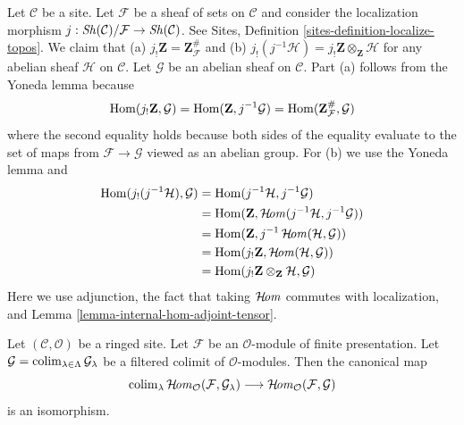 \begin{remark}
\label{remark-j-shriek-tensor}
Let $\mathcal{C}$ be a site. Let $\mathcal{F}$ be a sheaf of
sets on $\mathcal{C}$ and consider the localization morphism
$j : \mathop{\mathit{Sh}}\nolimits(\mathcal{C})/\mathcal{F} \to \mathop{\mathit{Sh}}\nolimits(\mathcal{C})$.
See Sites, Definition \ref{sites-definition-localize-topos}.
We claim that (a) $j_!\mathbf{Z} = \mathbf{Z}_\mathcal{F}^\#$
and (b) $j_!(j^{-1}\mathcal{H}) = j_!\mathbf{Z} \otimes_\mathbf{Z} \mathcal{H}$
for any abelian sheaf $\mathcal{H}$ on $\mathcal{C}$.
Let $\mathcal{G}$ be an abelian sheaf on $\mathcal{C}$.
Part (a) follows from the Yoneda lemma because
$$
\mathop{\mathrm{Hom}}\nolimits(j_!\mathbf{Z}, \mathcal{G}) =
\mathop{\mathrm{Hom}}\nolimits(\mathbf{Z}, j^{-1}\mathcal{G}) =
\mathop{\mathrm{Hom}}\nolimits(\mathbf{Z}_\mathcal{F}^\#, \mathcal{G})
$$
where the second equality holds because both sides of
the equality evaluate to the set of maps from $\mathcal{F} \to \mathcal{G}$
viewed as an abelian group. For (b) we use the Yoneda lemma and
\begin{align*}
\mathop{\mathrm{Hom}}\nolimits(j_!(j^{-1}\mathcal{H}), \mathcal{G})
& =
\mathop{\mathrm{Hom}}\nolimits(j^{-1}\mathcal{H}, j^{-1}\mathcal{G}) \\
& =
\mathop{\mathrm{Hom}}\nolimits(\mathbf{Z}, \mathop{\mathcal{H}\!\mathit{om}}\nolimits(j^{-1}\mathcal{H}, j^{-1}\mathcal{G})) \\
& =
\mathop{\mathrm{Hom}}\nolimits(\mathbf{Z}, j^{-1}\mathop{\mathcal{H}\!\mathit{om}}\nolimits(\mathcal{H}, \mathcal{G})) \\
& =
\mathop{\mathrm{Hom}}\nolimits(j_!\mathbf{Z}, \mathop{\mathcal{H}\!\mathit{om}}\nolimits(\mathcal{H}, \mathcal{G})) \\
& =
\mathop{\mathrm{Hom}}\nolimits(j_!\mathbf{Z} \otimes_\mathbf{Z} \mathcal{H}, \mathcal{G})
\end{align*}
Here we use adjunction, the fact that taking $\mathop{\mathcal{H}\!\mathit{om}}\nolimits$ commutes
with localization, and Lemma \ref{lemma-internal-hom-adjoint-tensor}.
\end{remark}

\begin{lemma}
\label{lemma-hom-finite-presentation-colimit}
Let $(\mathcal{C}, \mathcal{O})$ be a ringed site.
Let $\mathcal{F}$ be an $\mathcal{O}$-module of finite presentation. Let
$\mathcal{G} = \mathop{\mathrm{colim}}\nolimits_{\lambda \in \Lambda} \mathcal{G}_\lambda$
be a filtered colimit of $\mathcal{O}$-modules. Then the canonical map
$$
\mathop{\mathrm{colim}}\nolimits_\lambda \mathop{\mathcal{H}\!\mathit{om}}\nolimits_\mathcal{O}(\mathcal{F}, \mathcal{G}_\lambda)
\longrightarrow
\mathop{\mathcal{H}\!\mathit{om}}\nolimits_\mathcal{O}(\mathcal{F}, \mathcal{G})
$$
is an isomorphism.
\end{lemma}

